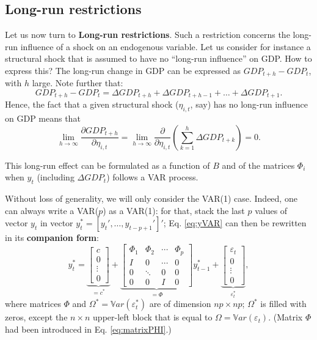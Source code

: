 \documentclass[
  12pt,
]{book}
\theoremstyle{definition}
\theoremstyle{definition}
\theoremstyle{definition}
\theoremstyle{definition}
\theoremstyle{remark}
\begin{document}
\hypertarget{long-run-restrictions}{%
\subsection{Long-run restrictions}\label{long-run-restrictions}}

Let us now turn to \textbf{Long-run restrictions}. Such a restriction concerns the long-run influence of a shock on an endogenous variable. Let us consider for instance a structural shock that is assumed to have no ``long-run influence'' on GDP. How to express this? The long-run change in GDP can be expressed as \(GDP_{t+h} - GDP_t\), with \(h\) large. Note further that:
\[
GDP_{t+h} - GDP_t = \Delta GDP_{t+h} +\Delta GDP_{t+h-1} + \dots + \Delta GDP_{t+1}.
\]
Hence, the fact that a given structural shock (\(\eta_{i,t}\), say) has no long-run influence on GDP means that
\[
\lim_{h\rightarrow\infty}\frac{\partial GDP_{t+h}}{\partial \eta_{i,t}} = \lim_{h\rightarrow\infty} \frac{\partial}{\partial \eta_{i,t}}\left(\sum_{k=1}^h \Delta  GDP_{t+k}\right)= 0.
\]

This long-run effect can be formulated as a function of \(B\) and of the matrices \(\Phi_i\) when \(y_t\) (including \(\Delta GDP_t\)) follows a VAR process.

Without loss of generality, we will only consider the VAR(1) case. Indeed, one can always write a VAR(\(p\)) as a VAR(1): for that, stack the last \(p\) values of vector \(y_t\) in vector \(y_{t}^{*}=[y_t',\dots,y_{t-p+1}']'\); Eq. \eqref{eq:yVAR} can then be rewritten in its \textbf{companion form}:
\begin{equation}
y_{t}^{*} =
\underbrace{\left[\begin{array}{c}
c\\
0\\
\vdots\\
0\end{array}\right]}_{=c^*}+
\underbrace{\left[\begin{array}{cccc}
\Phi_{1} & \Phi_{2} & \cdots & \Phi_{p}\\
I & 0 & \cdots & 0\\
0 & \ddots & 0 & 0\\
0 & 0 & I & 0\end{array}\right]}_{=\Phi}
y_{t-1}^{*}+
\underbrace{\left[\begin{array}{c}
\varepsilon_{t}\\
0\\
\vdots\\
0\end{array}\right]}_{\varepsilon_t^*},\label{eq:ystarVAR}
\end{equation}
where matrices \(\Phi\) and \(\Omega^* = \mathbb{V}ar(\varepsilon_t^*)\) are of dimension \(np \times np\); \(\Omega^*\) is filled with zeros, except the \(n\times n\) upper-left block that is equal to \(\Omega = \mathbb{V}ar(\varepsilon_t)\). (Matrix \(\Phi\) had been introduced in Eq. \eqref{eq:matrixPHI}.)
\end{document}
